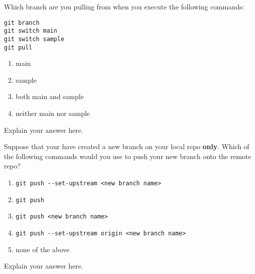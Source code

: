 \documentclass[12pt,fleqn]{examtst}
\begin{document}

\newpage
\noindent
\begin{minipage}{\textwidth}

Which branch are you pulling from when you execute the following commands:

\begin{lstlisting}
git branch
git switch main
git switch sample
git pull
\end{lstlisting}

\begin{enumerate}
    \item main
    \item sample \marker
    \item both main and sample
    \item neither main nor sample
\end{enumerate}
Explain your answer here.

Suppose that your have created a new branch on your local repo \textbf{only}. Which of the following commands would you use to push your new branch onto the remote repo?

\begin{enumerate}
    \item \lstinline{git push --set-upstream <new branch name>}
    \item \lstinline{git push}
    \item \lstinline{git push <new branch name>}
    \item \lstinline{git push --set-upstream origin <new branch name>} \marker
    \item none of the above
\end{enumerate}
Explain your answer here.

\end{minipage}
\end{document}
